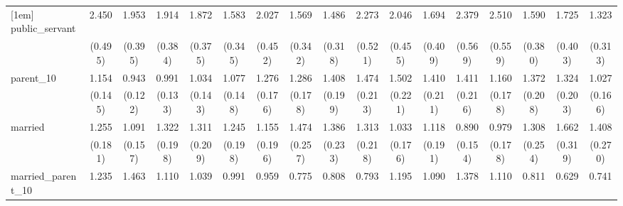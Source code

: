 {\begin{tabular}{l*{16}{c}}
[1em]
public\_servant      &       2.450\sym{***}&       1.953\sym{***}&       1.914\sym{**} &       1.872\sym{**} &       1.583\sym{*}  &       2.027\sym{**} &       1.569\sym{*}  &       1.486         &       2.273\sym{***}&       2.046\sym{**} &       1.694\sym{*}  &       2.379\sym{***}&       2.510\sym{***}&       1.590         &       1.725\sym{*}  &       1.323         \\
                    &     (0.495)         &     (0.395)         &     (0.384)         &     (0.375)         &     (0.345)         &     (0.452)         &     (0.342)         &     (0.318)         &     (0.521)         &     (0.455)         &     (0.409)         &     (0.569)         &     (0.559)         &     (0.380)         &     (0.403)         &     (0.313)         \\
[1em]
parent\_10           &       1.154         &       0.943         &       0.991         &       1.034         &       1.077         &       1.276         &       1.286         &       1.408\sym{*}  &       1.474\sym{**} &       1.502\sym{**} &       1.410\sym{*}  &       1.411\sym{*}  &       1.160         &       1.372\sym{*}  &       1.324         &       1.027         \\
                    &     (0.145)         &     (0.122)         &     (0.133)         &     (0.143)         &     (0.148)         &     (0.176)         &     (0.178)         &     (0.199)         &     (0.213)         &     (0.221)         &     (0.211)         &     (0.216)         &     (0.178)         &     (0.208)         &     (0.203)         &     (0.166)         \\
[1em]
married             &       1.255         &       1.091         &       1.322         &       1.311         &       1.245         &       1.155         &       1.474\sym{*}  &       1.386         &       1.313         &       1.033         &       1.118         &       0.890         &       0.979         &       1.308         &       1.662\sym{**} &       1.408         \\
                    &     (0.181)         &     (0.157)         &     (0.198)         &     (0.209)         &     (0.198)         &     (0.196)         &     (0.257)         &     (0.233)         &     (0.218)         &     (0.176)         &     (0.191)         &     (0.154)         &     (0.178)         &     (0.254)         &     (0.319)         &     (0.270)         \\
[1em]
married\_parent\_10   &       1.235         &       1.463\sym{*}  &       1.110         &       1.039         &       0.991         &       0.959         &       0.775         &       0.808         &       0.793         &       1.195         &       1.090         &       1.378         &       1.110         &       0.811         &       0.629         &       0.741         \\

\end{tabular}}
